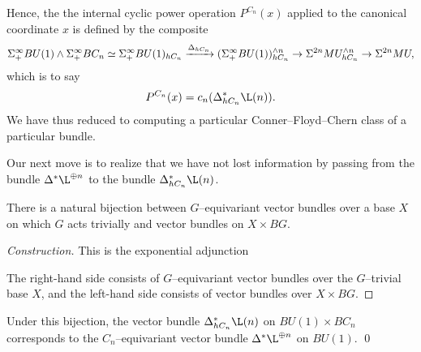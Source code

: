 Hence, the the internal cyclic power operation $P^{C_n}(x)$ applied to the canonical coordinate $x$ is defined by the composite \[\Sigma^\infty_+ BU(1) \wedge \Sigma^\infty_+ BC_n \simeq \Sigma^\infty_+ BU(1)_{hC_n} \xrightarrow{\Delta_{hC_n}} (\Sigma^\infty_+ BU(1))^{\wedge n}_{hC_n} \to \Sigma^{2n} MU^{\wedge n}_{hC_n} \to \Sigma^{2n} MU,\] which is to say \[P^{C_n}(x) = c_n(\Delta_{hC_n}^* \L(n)).\]  We have thus reduced to computing a particular Conner--Floyd--Chern class of a particular bundle.

Our next move is to realize that we have not lost information by passing from the bundle $\Delta^* \L^{\oplus n}$ to the bundle $\Delta_{hC_n}^* \L(n)$.
\begin{theorem}\label{GEquivBundlesVsBundlesOverBG}
There is a natural bijection between $G$--equivariant vector bundles over a base $X$ on which $G$ acts trivially and vector bundles on $X \times BG$.
\end{theorem}
\begin{proof}[Construction]
This is the exponential adjunction
\begin{center}
\end{center}
The right-hand side consists of $G$--equivariant vector bundles over the $G$--trivial base $X$, and the left-hand side consists of vector bundles over $X \times BG$.
\end{proof}

\begin{corollary}
Under this bijection, the vector bundle $\Delta_{hC_n}^* \L(n)$ on $BU(1) \times BC_n$ corresponds to the $C_n$--equivariant vector bundle $\Delta^* \L^{\oplus n}$ on $BU(1)$. \qed
\end{corollary}

